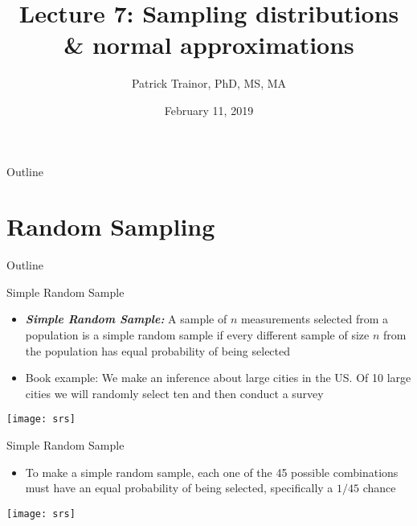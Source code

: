 \documentclass[xcolor=dvipsnames]{beamer}
\title[Lecture 7]{Lecture 7: Sampling distributions \& normal approximations}
\author[Patrick Trainor]{Patrick Trainor, PhD, MS, MA}
\institute[NMSU]{New Mexico State University}
\date{February 11, 2019}
\begin{document}
	
\begin{frame}
	\maketitle
\end{frame}

\begin{frame}{Outline}
	\tableofcontents[hideallsubsections]
\end{frame}

\section{Random Sampling}
\begin{frame}{Outline}
	\tableofcontents[currentsection,subsectionstyle=show/shaded/hide]
\end{frame}

\begin{frame}{Simple Random Sample}
	\begin{itemize}
		\item \textbf{\emph{Simple Random Sample:}} A sample of $n$ measurements selected from a population is a simple random sample if every different sample of size $n$ from the population has equal probability of being selected \pause 
		\item Book example: We make an inference about large cities in the US. Of 10 large cities we will randomly select ten and then conduct a survey \pause 
	\end{itemize}
	\begin{center}
		\texttt{[image: srs]}
	\end{center}
\end{frame}

\begin{frame}{Simple Random Sample}
	\begin{itemize}
		\item To make a simple random sample, each one of the 45 possible combinations must have an equal probability of being selected, specifically a $1/45$ chance 
	\end{itemize}
	\begin{center}
		\texttt{[image: srs]}
	\end{center}
\end{frame}
\end{document}
